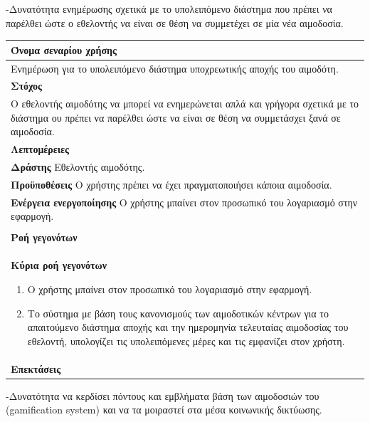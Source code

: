 -Δυνατότητα ενημέρωσης σχετικά με το υπολειπόμενο διάστημα που πρέπει να παρέλθει ώστε ο εθελοντής να είναι σε θέση να συμμετέχει σε μία νέα αιμοδοσία.

\begin{center}
    \begin{tabular}{|p{\dimexpr \linewidth-2\tabcolsep}|}
    \hline
    \rowcolor{grayy}
    \textbf{Όνομα σεναρίου χρήσης}
    \\ \hline    
     Ενημέρωση για το υπολειπόμενο διάστημα υποχρεωτικής αποχής του αιμοδότη.
     \\ \hline
    \rowcolor{grayy}
    \textbf{\textbf{Στόχος}}
    \\ \hline
 	 Ο εθελοντής αιμοδότης να μπορεί να ενημερώνεται απλά και γρήγορα σχετικά με το διάστημα ου πρέπει να παρέλθει ώστε να είναι σε θέση να συμμετάσχει ξανά σε αιμοδοσία.
    \\ \hline
    \rowcolor{grayy}
    \textbf{Λεπτομέρειες}
    \\ \hline
	\textbf{Δράστης} Εθελοντής αιμοδότης.
	\\*
	\textbf{Προϋποθέσεις} Ο χρήστης πρέπει να έχει πραγματοποιήσει κάποια αιμοδοσία.
	\\*
	\textbf{Ενέργεια ενεργοποίησης} Ο χρήστης μπαίνει στον προσωπικό του λογαριασμό στην εφαρμογή.
	\\ \hline
    \\ \hline
	\rowcolor{grayy}    
    \textbf{Ροή γεγονότων}
    \\* 
	\textbf{Κύρια ροή γεγονότων}
	\begin{enumerate}
	\item	 Ο χρήστης μπαίνει στον προσωπικό του λογαριασμό στην εφαρμογή.
	\item  Το σύστημα με βάση τους κανονισμούς των αιμοδοτικών κέντρων για το απαιτούμενο διάστημα αποχής και την ημερομηνία τελευταίας αιμοδοσίας του εθελοντή, υπολογίζει τις υπολειπόμενες μέρες και τις εμφανίζει στον χρήστη.
	\end{enumerate}
	\\*
	\textbf{Επεκτάσεις}
	   \\ \hline
    \end{tabular}
\end{center}	

-Δυνατότητα να κερδίσει πόντους και εμβλήματα βάση των αιμοδοσιών του (gamification system) και να τα μοιραστεί στα μέσα κοινωνικής δικτύωσης.

